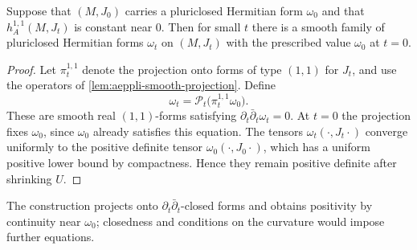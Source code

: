 \begin{theorem}\label{thm:pluriclosed-deformation-persistence}
Suppose that $(M,J_0)$ carries a pluriclosed Hermitian form $\omega_0$ and that $h_A^{1,1}(M,J_t)$ is constant near $0$. Then for small $t$ there is a smooth family of pluriclosed Hermitian forms $\omega_t$ on $(M,J_t)$ with the prescribed value $\omega_0$ at $t=0$.
\end{theorem}
\begin{proof}
Let $\pi_t^{1,1}$ denote the projection onto forms of type $(1,1)$ for $J_t$, and use the operators of \cref{lem:aeppli-smooth-projection}. Define
\[
 \omega_t=\mathcal P_t\bigl(\pi_t^{1,1}\omega_0\bigr).
\]
These are smooth real $(1,1)$-forms satisfying $\partial_t\bar\partial_t\omega_t=0$. At $t=0$ the projection fixes $\omega_0$, since $\omega_0$ already satisfies this equation. The tensors $\omega_t(\cdot,J_t\cdot)$ converge uniformly to the positive definite tensor $\omega_0(\cdot,J_0\cdot)$, which has a uniform positive lower bound by compactness. Hence they remain positive definite after shrinking $U$.
\end{proof}

The construction projects onto $\partial_t\bar\partial_t$-closed forms and obtains positivity by continuity near $\omega_0$; closedness and conditions on the curvature would impose further equations.
